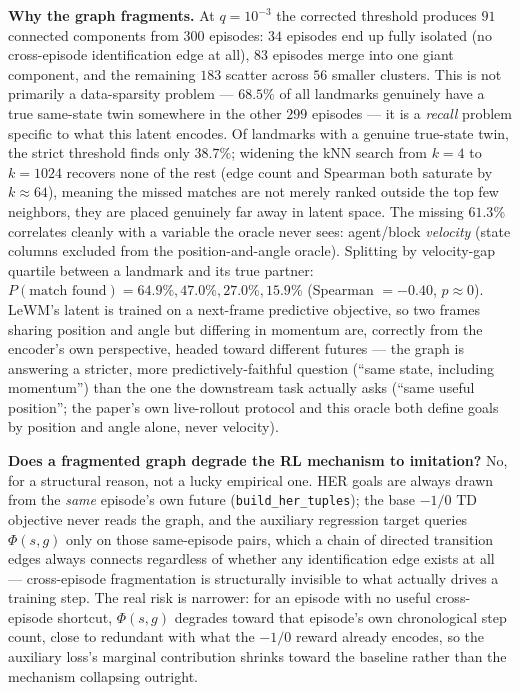 \documentclass[11pt]{article}
\begin{document}
\textbf{Why the graph fragments.} At $q{=}10^{-3}$ the corrected threshold produces $91$
connected components from $300$ episodes: $34$ episodes end up fully isolated (no cross-episode
identification edge at all), $83$ episodes merge into one giant component, and the remaining
$183$ scatter across $56$ smaller clusters. This is not primarily a data-sparsity problem ---
$68.5\%$ of all landmarks genuinely have a true same-state twin somewhere in the other $299$
episodes --- it is a \emph{recall} problem specific to what this latent encodes. Of landmarks
with a genuine true-state twin, the strict threshold finds only $38.7\%$; widening the kNN
search from $k{=}4$ to $k{=}1024$ recovers none of the rest (edge count and Spearman both
saturate by $k{\approx}64$), meaning the missed matches are not merely ranked outside the top
few neighbors, they are placed genuinely far away in latent space. The missing $61.3\%$
correlates cleanly with a variable the oracle never sees: agent/block \emph{velocity} (state
columns excluded from the position-and-angle oracle). Splitting by velocity-gap quartile
between a landmark and its true partner: $P(\text{match found}) = 64.9\%, 47.0\%, 27.0\%,
15.9\%$ (Spearman $=-0.40$, $p\approx0$). LeWM's latent is trained on a next-frame predictive
objective, so two frames sharing position and angle but differing in momentum are, correctly
from the encoder's own perspective, headed toward different futures --- the graph is answering a
stricter, more predictively-faithful question (``same state, including momentum'') than the one
the downstream task actually asks (``same useful position''; the paper's own live-rollout
protocol and this oracle both define goals by position and angle alone, never velocity).

\textbf{Does a fragmented graph degrade the RL mechanism to imitation?} No, for a structural
reason, not a lucky empirical one. HER goals are always drawn from the \emph{same} episode's own
future (\texttt{build\_her\_tuples}); the base $-1/0$ TD objective never reads the graph, and the
auxiliary regression target queries $\Phi(s,g)$ only on those same-episode pairs, which a chain
of directed transition edges always connects regardless of whether any identification edge
exists at all --- cross-episode fragmentation is structurally invisible to what actually drives a
training step. The real risk is narrower: for an episode with no useful cross-episode shortcut,
$\Phi(s,g)$ degrades toward that episode's own chronological step count, close to redundant with
what the $-1/0$ reward already encodes, so the auxiliary loss's marginal contribution shrinks
toward the baseline rather than the mechanism collapsing outright.
\end{document}
